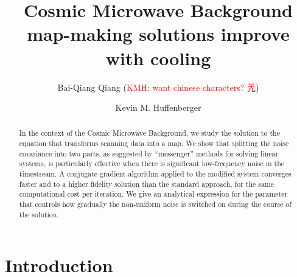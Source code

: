 \documentclass[twocolumn,linenumbers]{aastex631}
\newcommand{\kmh}[1]{\textcolor{red}{KMH: #1}}
\begin{document}
\title{Cosmic Microwave Background map-making solutions improve with cooling}


  \author{Bai-Qiang Qiang (\kmh{want chinese characters? 羌})}

\author[0000-0001-7109-0099]{Kevin M. Huffenberger}

 
\begin{abstract}

In the context of the Cosmic Microwave Background, we study the solution to the equation that transforms scanning data into a map.  We show that splitting the noise covariance into two parts, as suggested by ``messenger'' methods for solving linear systems, is particularly effective when there is significant low-frequency noise in the timestream.  A conjugate gradient algorithm applied to the modified system converges faster and to a higher fidelity solution than the standard approach, for the same computational cost per iteration.
%
We give an analytical expression for the parameter that controls how gradually the non-uniform noise is switched on during the course of the solution. 

\end{abstract}


\section{Introduction} \label{sec:intro}
\end{document}
